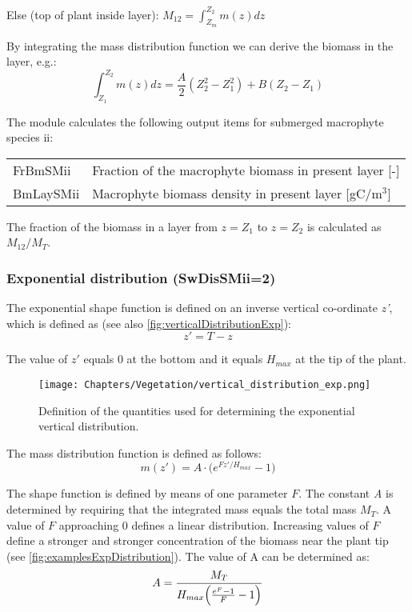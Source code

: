 Else (top of plant inside layer): $M_{12} = \int_{Z_m}^{Z_2} m(z)dz$

By integrating the mass distribution function we can derive the biomass in the layer, e.g.:
%
\begin{equation}
    \int_{Z_1}^{Z_2} m(z)dz = \frac{A}{2}(Z_2^2 - Z_1^2) + B(Z_2 - Z_1)
\end{equation}

The module calculates the following output items for submerged macrophyte species ii:

\begin{tabular}{ll}
FrBmSMii              &  Fraction of the macrophyte biomass in present layer [-]  \\
BmLaySMii             &  Macrophyte biomass density in present layer [gC/m$^3$]      \\
\end{tabular}

The fraction of the biomass in a layer from $z = Z_1$ to $z = Z_2$ is calculated as $M_{12} / M_T$.


\subsubsection{Exponential distribution (SwDisSMii=2)}

The exponential shape function is defined on an inverse vertical co-ordinate \emph{z'}, which is defined as
(see also \autoref{fig:verticalDistributionExp}):
%
\begin{equation}
   z' = T - z
\end{equation}

The value of $z'$ equals 0 at the bottom and it equals $H_{max}$ at the tip of the plant.

\begin{figure}
\centering
\texttt{[image: Chapters/Vegetation/vertical\_distribution\_exp.png]}
\caption{Definition of the quantities used for determining the exponential vertical distribution.}
\label{fig:verticalDistributionExp}
\end{figure}

The mass distribution function is defined as follows:
%
\begin{equation}
   m(z') = A \cdot \bigl( e^{Fz'/H_{max}} - 1 \bigr)
\end{equation}

The shape function is defined by means of one parameter $F$. The constant \emph{A} is determined by
requiring that the integrated mass equals the total mass $M_T$. A value of $F$ approaching 0 defines a
linear distribution. Increasing values of $F$ define a stronger and stronger concentration of the biomass
near the plant tip (see \autoref{fig:examplesExpDistribution}).
%
The value of A can be determined as:
%
\begin{equation}
   A = \frac{M_T}{H_{max} \Bigl( \frac{{e^F} - 1}{F} - 1 \Bigr)}
\end{equation}

